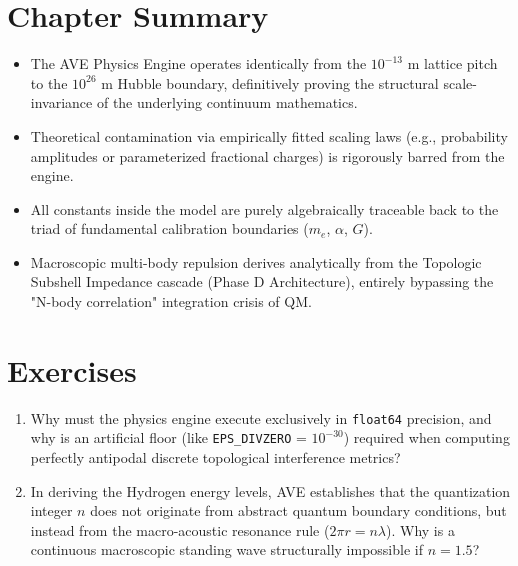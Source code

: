 \section*{Chapter Summary}
\begin{itemize}
    \item The AVE Physics Engine operates identically from the $10^{-13}\text{ m}$ lattice pitch to the $10^{26}\text{ m}$ Hubble boundary, definitively proving the structural scale-invariance of the underlying continuum mathematics.
    \item Theoretical contamination via empirically fitted scaling laws (e.g., probability amplitudes or parameterized fractional charges) is rigorously barred from the engine.
    \item All constants inside the model are purely algebraically traceable back to the triad of fundamental calibration boundaries ($m_e$, $\alpha$, $G$).
    \item Macroscopic multi-body repulsion derives analytically from the Topologic Subshell Impedance cascade (Phase D Architecture), entirely bypassing the "N-body correlation" integration crisis of QM.
\end{itemize}

\section*{Exercises}
\begin{enumerate}
    \item Why must the physics engine execute exclusively in \texttt{float64} precision, and why is an artificial floor (like \texttt{EPS\_DIVZERO} = $10^{-30}$) required when computing perfectly antipodal discrete topological interference metrics?
    \item In deriving the Hydrogen energy levels, AVE establishes that the quantization integer $n$ does not originate from abstract quantum boundary conditions, but instead from the macro-acoustic resonance rule ($2\pi r = n \lambda$). Why is a continuous macroscopic standing wave structurally impossible if $n = 1.5$?
\end{enumerate}
